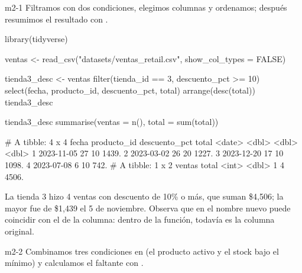 
\begin{solucion}{m2-1}
Filtramos con dos condiciones, elegimos columnas y ordenamos; después
resumimos el resultado con .
\end{solucion}

\begin{rcode}
library(tidyverse)
\end{rcode}

\begin{rcode}
ventas <- read_csv("datasets/ventas_retail.csv", show_col_types = FALSE)

tienda3_desc <- ventas %
  filter(tienda_id == 3, descuento_pct >= 10) %
  select(fecha, producto_id, descuento_pct, total) %
  arrange(desc(total))
tienda3_desc

tienda3_desc %
  summarise(ventas = n(), total = sum(total))
\end{rcode}
\begin{rsalida}
# A tibble: 4 x 4
  fecha      producto_id descuento_pct total
  <date>           <dbl>         <dbl> <dbl>
1 2023-11-05          27            10 1439.
2 2023-03-02          26            20 1227.
3 2023-12-20          17            10 1098.
4 2023-07-08           6            10  742.
# A tibble: 1 x 2
  ventas total
   <int> <dbl>
1      4 4506.
\end{rsalida}

La tienda 3 hizo 4 ventas con descuento de 10\% o más, que suman
\$4,506; la mayor fue de \$1,439 el 5 de noviembre. Observa que en
 el nombre nuevo puede coincidir con
el de la columna: dentro de la función,  todavía es la
columna original.


\begin{solucion}{m2-2}
Combinamos tres condiciones en  (el producto activo y el
stock bajo el mínimo) y calculamos el faltante con .
\end{solucion}

